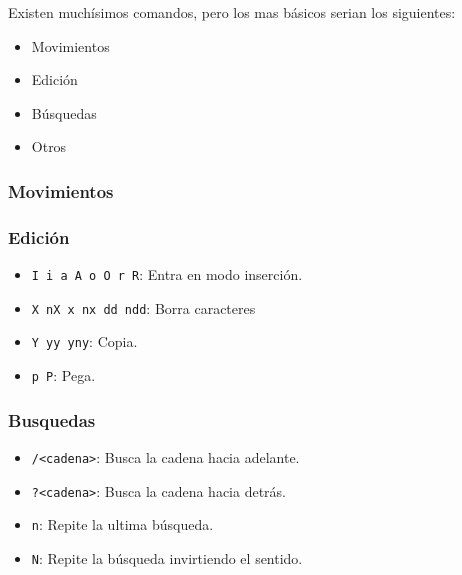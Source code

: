 \documentclass[10pt]{beamer}
\begin{document}
  
  \begin{frame}
    Existen muchísimos comandos, pero los mas básicos serian los siguientes:
    \begin{itemize}
      \item Movimientos
      \item Edición
      \item Búsquedas
      \item Otros
    \end{itemize}
  \end{frame}
  
  \begin{frame}[containsverbatim]
    \frametitle{Movimientos}
  \end{frame}
  
  \begin{frame}[containsverbatim]
    \frametitle{Edición}
    \begin{itemize}
      \item \verb+I i a A o O r R+: Entra en modo inserción.
      \item \verb+X nX x nx dd ndd+: Borra caracteres
      \item \verb+Y yy yny+: Copia.
      \item \verb+p P+: Pega.
    \end{itemize}
  \end{frame}
  
  \begin{frame}[containsverbatim]
    \frametitle{Busquedas}
    \begin{itemize}
      \item \verb+/<cadena>+: Busca la cadena hacia adelante.
      \item \verb+?<cadena>+: Busca la cadena hacia detrás.
      \item \verb+n+: Repite la ultima búsqueda.
      \item \verb+N+: Repite la búsqueda invirtiendo el sentido.
    \end{itemize}
  \end{frame}
  
\end{document}
